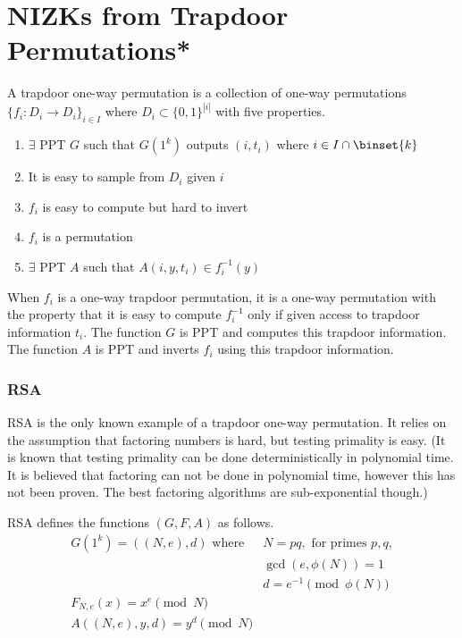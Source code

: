 \section{NIZKs from Trapdoor Permutations*}

\begin{definition}
A trapdoor one-way permutation is a collection of one-way permutations $\{f_i : D_i \rightarrow D_i\}_{i \in I}$ where $D_i \subset \{0,1\}^{|i|}$ with
five properties.

\begin{enumerate}
\item $\exists$ PPT $G$ such that $G(1^k)$ outputs $(i,t_i)$ where $i \in I\cap \binset{k}$
\item It is easy to sample from $D_i$ given $i$ 
\item $f_i$ is easy to compute but hard to invert
\item  $f_i$ is a permutation
\item $\exists$ PPT $A$ such that $A(i, y, t_i)\in f_i^{-1}(y)$
\end{enumerate}
\end{definition}

When $f_i$ is a one-way trapdoor permutation, it is a one-way permutation with
the property that it is easy to compute $f_i^{-1}$ only if given access to trapdoor
information $t_i$. The function $G$ is PPT and computes this trapdoor information.
The function $A$ is PPT and inverts $f_i$ using this trapdoor information.

\subsubsection{RSA}

RSA is the only known example of a trapdoor one-way permutation.
It relies on the assumption that factoring numbers is hard,
but testing primality is easy. (It is known that testing primality can be done
deterministically in polynomial time. It is believed that factoring can not be done in
polynomial time, however this has not been proven. The best factoring algorithms
are sub-exponential though.)

\begin{definition}
RSA defines the functions $(G, F, A)$ as follows.
\begin{align*}
G(1^k) = ((N, e), d) \,\,\text{where} \,\,& N=pq, \,\, \text{for primes $p,q$},  \\
& \gcd(e,\phi(N))=1 \\
& d = e^{-1} \pmod{\phi(N)} \\
F_{N,e}(x) = x^e \pmod{N} & \\
A((N,e),y, d) = y^d \pmod{N} &
\end{align*}
\end{definition}

